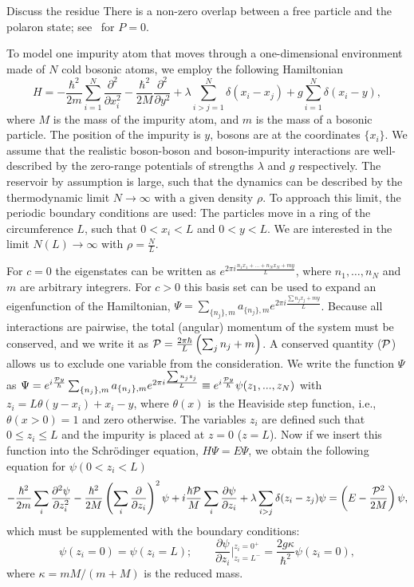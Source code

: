 \documentclass[twocolumn,amsmath,amssymb,showpacs,prl,superscriptaddress,aps]{revtex4-1}
\begin{document}
{\color{blue} Discuss the residue} 
There is a non-zero overlap between a free particle and the polaron state; see~\cite{volosniev2017} for $P=0$.

To model one impurity atom that moves through a one-dimensional environment made of $N$ cold bosonic atoms, we employ the following Hamiltonian
\begin{equation}
H=-\frac{\hbar^2}{2m}\sum_{i=1}^N\frac{\partial^2}{\partial x_i^2}-\frac{\hbar^2}{2M}\frac{\partial^2}{\partial y^2}+\lambda \sum_{i>j=1}^N\delta(x_i-x_j)+g \sum_{i=1}^N \delta(x_i-y),
\end{equation}
where $M$ is the mass of the impurity atom, and $m$ is the mass of a bosonic particle. The position of the impurity is $y$, bosons are at the coordinates $\{x_i\}$. 
We assume that the realistic boson-boson and boson-impurity interactions are well-described by the zero-range potentials of strengths $\lambda$ and $g$ respectively. 
The reservoir by assumption is large, such that the dynamics can be described by the thermodynamic limit $N\to \infty$ with a given density $\rho$.
To approach this limit, the periodic boundary conditions are used: The particles move in a ring of the circumference $L$, such that $0<x_i<L$ and $0<y<L$.
We are interested in the limit $N(L)\to \infty$ with $\rho=\frac{N}{L}$.


For $c=0$ the eigenstates can be written as $e^{2\pi i \frac{n_1x_1+\ldots+n_N x_N+my}{L}}$, where $n_1,\ldots,n_N$ and $m$ are arbitrary integrers. 
For $c>0$ this basis set can be used to expand an eigenfunction of the Hamiltonian, $\Psi=\sum_{\{n_j\},m} a_{\{n_j\},m}e^{2\pi i \frac{\sum n_jx_j+my}{L}}$. 
Because all interactions are pairwise, 
the total (angular) momentum of the system must be conserved, and we write it as ${\cal P}=\frac{2\pi\hbar}{L}\left(\sum_{j} n_j+m\right)$.
A conserved quantity (${\cal P}$) allows us to exclude one variable from the consideration. 
We write the function $\Psi$ as $\Psi=e^{i \frac{{\cal P} y}{\hbar}}\sum_{\{n_j\},m} a_{\{n_j\},m}e^{2\pi i \frac{\sum n_jz_j}{L}}\equiv e^{i \frac{{\cal P} y}{\hbar}} \psi(z_1,...,z_N)$ 
with $z_i=L\theta(y-x_i)+x_i-y$, where $\theta(x)$ is the Heaviside step function, i.e., 
$\theta(x>0) = 1$ and zero otherwise. The variables $z_i$ are defined such that $0\leq z_i \leq L$ and the impurity is placed at $z=0$ ($z=L$). Now if we insert this 
function into the Schr{\"o}dinger equation, $H\Psi=E\Psi$, we obtain the following equation for $\psi(0<z_i<L)$
\begin{equation}
-\frac{\hbar^2}{2m}\sum_i\frac{\partial^2 \psi}{\partial z_i^2}-\frac{\hbar^2}{2M}\left(\sum_{i}\frac{\partial }{\partial z_i}\right)^2\psi
+ i \frac{\hbar {\cal P}}{M}\sum_{i}\frac{\partial \psi}{\partial z_i}+\lambda \sum_{i>j}\delta(z_i-z_j)\psi=\left(E-\frac{{\cal P}^2}{2M}\right)\psi,
\end{equation}
which must be supplemented with the boundary conditions:
\begin{equation}
\psi(z_i=0)=\psi(z_i=L); \qquad \frac{\partial \psi}{\partial z_i}\bigg|^{z_i=0^+}_{z_i=L^-}= \frac{2 g \kappa}{\hbar^2} \psi(z_i=0),
\end{equation}
where $\kappa=mM/(m+M)$ is the reduced mass.
\end{document}

